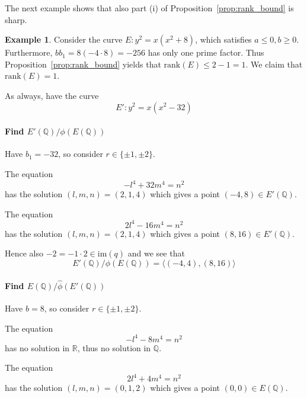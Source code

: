 \documentclass{scrartcl}
\newcommand{\Q}{\mathbb{Q}}
\newcommand{\im}{\mathrm{im}}
\theoremstyle{definition}
\newtheorem{example}[subsection]{Example}
\begin{document}
The next example shows that also part (i) of Proposition~\ref{prop:rank_bound} is sharp.
\begin{example}
    Consider the curve $E: y^2 = x(x^2 + 8)$, which satisfies $a \leq 0, b \geq 0$.
    Furthermore, $b b_1 = 8(-4 \cdot 8) = -256$ has only one prime factor.
    Thus Proposition~\ref{prop:rank_bound} yields that $\mathrm{rank}(E) \leq 2 - 1 = 1$.
    We claim that $\mathrm{rank}(E) = 1$.

    As always, have the curve
    \begin{equation*}
        E': y^2 = x(x^2 - 32)
    \end{equation*}
    \paragraph{Find $E'(\Q)/\phi(E(\Q))$} Have $b_1 = -32$, so consider $r \in \{ \pm 1, \pm 2 \}$.
    
    The equation
    \begin{equation*}
        -l^4 + 32m^4 = n^2
    \end{equation*}
    has the solution $(l, m, n) = (2, 1, 4)$ which gives a point $(-4, 8) \in E'(\Q)$.

    The equation
    \begin{equation*}
        2l^4 -16m^4 = n^2
    \end{equation*}
    has the solution $(l, m, n) = (2, 1, 4)$ which gives a point $(8, 16) \in E'(\Q)$.

    Hence also $-2 = -1 \cdot 2 \in \im(q)$ and we see that
    \begin{equation*}
        E'(\Q)/\phi(E(\Q)) = \langle (-4, 4), (8, 16) \rangle
    \end{equation*}

    \paragraph{Find $E(\Q)/\hat{\phi}(E'(\Q))$} Have $b = 8$, so consider $r \in \{ \pm 1, \pm 2 \}$.

    The equation
    \begin{equation*}
        -l^4 - 8m^4 = n^2
    \end{equation*}
    has no solution in $\mathbb{R}$, thus no solution in $\Q$.

    The equation
    \begin{equation*}
        2l^4 + 4m^4 = n^2
    \end{equation*}
    has the solution $(l, m, n) = (0, 1, 2)$ which gives a point $(0, 0) \in E(\Q)$.


\end{example}
\end{document}
